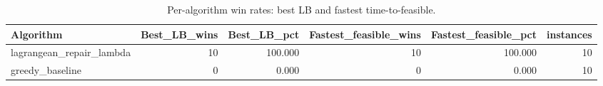 \begin{table}
\caption{Per-algorithm win rates: best LB and fastest time-to-feasible.}
\label{tab:win_rates}
\begin{tabular}{lrrrrr}
\toprule
Algorithm & Best\_LB\_wins & Best\_LB\_pct & Fastest\_feasible\_wins & Fastest\_feasible\_pct & instances \\
\midrule
lagrangean\_repair\_lambda & 10 & 100.000 & 10 & 100.000 & 10 \\
greedy\_baseline & 0 & 0.000 & 0 & 0.000 & 10 \\
\bottomrule
\end{tabular}
\end{table}
